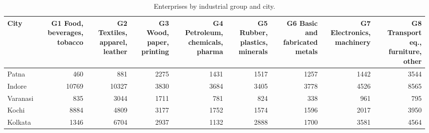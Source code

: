 \begin{table}[htbp]
\centering
\small
\caption{Enterprises by industrial group and city.}
\label{tab:s4a_group_counts}
\begin{tabular}{lrrrrrrrr}
\toprule
City & G1 Food, beverages, tobacco & G2 Textiles, apparel, leather & G3 Wood, paper, printing & G4 Petroleum, chemicals, pharma & G5 Rubber, plastics, minerals & G6 Basic and fabricated metals & G7 Electronics, machinery & G8 Transport eq., furniture, other \\
\midrule
Patna & 460 & 881 & 2275 & 1431 & 1517 & 1257 & 1442 & 3544 \\
Indore & 10769 & 10327 & 3830 & 3684 & 3405 & 3778 & 4526 & 8565 \\
Varanasi & 835 & 3044 & 1711 & 781 & 824 & 338 & 961 & 795 \\
Kochi & 8884 & 4809 & 3177 & 1752 & 1574 & 1596 & 2017 & 3950 \\
Kolkata & 1346 & 6704 & 2937 & 1132 & 2888 & 1700 & 3581 & 4564 \\
\bottomrule
\end{tabular}
\end{table}
